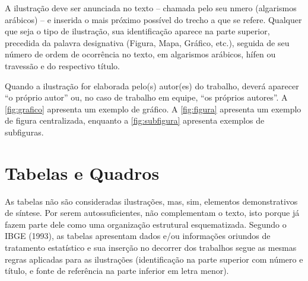 \documentclass[12pt,oneside,a4paper,chapter=TITLE,section=TITLE,sumario
=tradicional]{abntex2}
\begin{document}
A ilustração deve ser anunciada no texto – chamada pelo seu nmero (algarismos 
arábicos) – e inserida o mais próximo possível do trecho a que se refere.
Qualquer que seja o tipo de ilustração, sua identificação aparece na parte 
superior, precedida da palavra designativa (Figura, Mapa, Gráfico, etc.), 
seguida de seu número de ordem de ocorrência no texto, em algarismos arábicos, 
hífen ou travessão e do respectivo título.

Quando a ilustração for elaborada pelo(s) autor(es) do trabalho, deverá 
aparecer ``o próprio autor'' ou, no caso de trabalho em equipe, ``os próprios 
autores''. A \autoref{fig:grafico} apresenta um exemplo de gráfico. A 
\autoref{fig:figura} apresenta um exemplo de figura centralizada, enquanto a 
\autoref{fig:subfigura} apresenta exemplos de subfiguras.

\begin{grafico}[htb]
\end{grafico}

\begin{figure}[htb]
\end{figure}

\begin{figure}[htb]
    \hfil
    \hfil
    
    \hfil
    \hfil
    
\end{figure}

\section{Tabelas e Quadros}
\label{sec:tabelas}

As tabelas não são consideradas ilustrações, mas, sim, elementos demonstrativos 
de síntese. Por serem autossuficientes, não complementam o texto, isto porque 
já fazem parte dele como uma organização estrutural esquematizada. Segundo o 
IBGE (1993), as tabelas apresentam dados e/ou informações oriundos de 
tratamento estatístico e sua inserção no decorrer dos trabalhos segue as mesmas 
regras aplicadas para as ilustrações (identificação na parte superior com 
número e título, e fonte de referência na parte inferior em letra menor).
\end{document}
